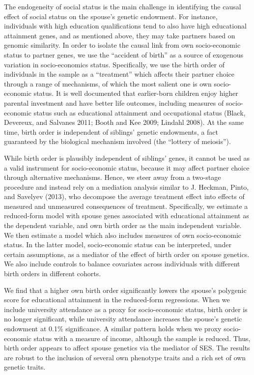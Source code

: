 \documentclass[
]{article}
\begin{document}
The endogeneity of social status is the main challenge in identifying the causal
effect of social status on the spouse's genetic endowment. For instance,
individuals with high education qualifications tend to also have high
educational attainment genes, and as mentioned above, they may take partners
based on genomic similarity. In order to isolate the causal link from own
socio-economic status to partner genes, we use the ``accident of birth''
as a source of exogenous variation in socio-economics status. Specifically, we
use the birth order of individuals in the sample as a ``treatment'' which affects
their partner choice through a range of mechanisms, of which the most salient
one is own socio-economic status. It is well documented that earlier-born
children enjoy higher parental investment and have better life outcomes,
including measures of socio-economic status such as educational attainment and
occupational status (Black, Devereux, and Salvanes 2011; Booth and Kee 2009; Lindahl 2008). At the
same time, birth order is independent of siblings' genetic endowments, a fact
guaranteed by the biological mechanism involved (the ``lottery of meiosis'').

While birth order is plausibly independent of siblings' genes, it cannot be used
as a valid instrument for socio-economic status, because it may affect partner
choice through alternative mechanisms. Hence, we steer away from a two-stage
procedure and instead rely on a mediation analysis similar to
J. Heckman, Pinto, and Savelyev (2013), who decompose the average treatment effect into
effects of measured and unmeasured consequences of treatment. Specifically, we
estimate a reduced-form model with spouse genes associated with educational
attainment as the dependent variable, and own birth order as the main
independent variable. We then estimate a model which also includes measures of
own socio-economic status. In the latter model, socio-economic status can be
interpreted, under certain assumptions, as a mediator of the effect of birth
order on spouse genetics. We also include controls to balance covariates across
individuals with different birth orders in different cohorts.

We find that a higher own birth order significantly lowers the spouse's
polygenic score for educational attainment in the reduced-form regressions. When
we include university attendance as a proxy for socio-economic status, birth
order is no longer significant, while university attendance increases the
spouse's genetic endowment at 0.1\% significance. A similar pattern holds
when we proxy socio-economic status with a measure of income, although the
sample is reduced. Thus, birth order appears to affect spouse genetics via the
mediator of SES. The results are robust to the inclusion of several own
phenotype traits and a rich set of own genetic traits.
\end{document}
